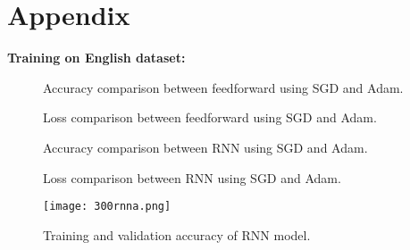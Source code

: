 \onecolumn
\newpage
\clearpage
\section{Appendix}
\textbf{Training on English dataset:}


    \begin{figure}[H]
      \centering
      \qquad
      \caption{Accuracy comparison between feedforward using SGD and Adam.}%
      \label{ffa}
    \end{figure}
    \begin{figure}[H]
      \centering
      \qquad
      \caption{Loss comparison between feedforward using SGD and Adam.}%
      \label{ffl}
    \end{figure}
    \begin{figure}[H]
      \centering
      \qquad
      \caption{Accuracy comparison between RNN using SGD and Adam.}%
      \label{rnna}
    \end{figure}
    \begin{figure}[h]
      \centering
      \qquad
      \caption{Loss comparison between RNN using SGD and Adam.}%
      \label{rnnl}
    \end{figure}
    \begin{figure}[h]
      \centering
      \texttt{[image: 300rnna.png]}
      \caption{Training and validation accuracy of RNN model.}
      \label{300rnna}
    \end{figure}

